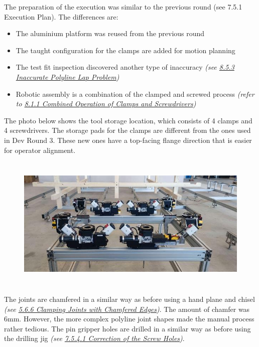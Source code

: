 \documentclass[11pt]{book}
\begin{document}
The preparation of the execution was similar to the previous round (see 7.5.1 Execution Plan). The differences are:

\begin{itemize}
	\item The aluminium platform was reused from the previous round

	\item The taught configuration for the clamps are added for motion planning

	\item The test fit inspection discovered another type of inaccuracy \textit{(see \uline{8.5.3 Inaccurate Polyline Lap Problem})}

	\item Robotic assembly is a combination of the clamped and screwed process \textit{(refer to \uline{8.1.1 Combined Operation of Clamps and Screwdrivers})}

\end{itemize}
The photo below shows the tool storage location, which consists of 4 clamps and 4 screwdrivers. The storage pads for the clamps are different from the ones used in Dev Round 3. These new ones have a top-facing flange direction that is easier for operator alignment.

\begin{figure}[H]
\includegraphics[width=14.33cm,height=6.49cm]{./images/image27.jpeg}
\end{figure}


The joints are chamfered in a similar way as before using a hand plane and chisel \textit{(see \uline{5.6.6 Clamping Joints with Chamfered Edges})}. The amount of chamfer was 6mm. However, the more complex polyline joint shapes made the manual process rather tedious. The pin gripper holes are drilled in a similar way as before using the drilling jig \textit{(see \uline{7.5.4.1 Correction of the Screw Holes})}.
\end{document}
